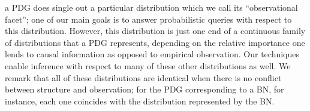 \documentclass[twoside]{article}
\newcommand\obslimit{observational facet} %
\begin{document}
{a PDG does single out a particular distribution which we call its ``\obslimit'';
one of our main goals 
is to answer probabilistic queries with respect to this distribution.
%
However, 
this distribution is just 
one end 
of a continuous family of distributions that a PDG represents,
depending on the relative importance one lends to 
    causal information as opposed to empirical observation.
Our techniques enable inference with respect to 
    many of these other distributions as well.
We remark that all of these distributions are identical
when there is no conflict between structure and observation;
for the PDG corresponding to a BN, for instance, each one
coincides with the distribution represented by the BN.
}
\end{document}
